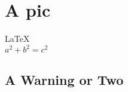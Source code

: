 \documentclass{article}
\begin{document}
               
 
\section{A pic}          
\LaTeX \,\\ 
 $a^2+b^2=c^2$

\subsection{A Warning or Two}  

\end{document}
